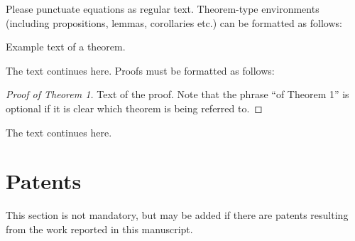 \documentclass[journal,article,submit,moreauthors,pdftex]{Definitions/mdpi}
\begin{document}
\begin{paracol}{2}
\linenumbers
\switchcolumn

Please punctuate equations as regular text. Theorem-type environments (including propositions, lemmas, corollaries etc.) can be formatted as follows:
\begin{Theorem}
Example text of a theorem.
\end{Theorem}

The text continues here. Proofs must be formatted as follows:

\begin{proof}[Proof of Theorem 1]
Text of the proof. Note that the phrase ``of Theorem 1'' is optional if it is clear which theorem is being referred to.
\end{proof}
The text continues here.

\section{Patents}

This section is not mandatory, but may be added if there are patents resulting from the work reported in this manuscript.

\vspace{6pt} 




\end{paracol}
\end{document}
